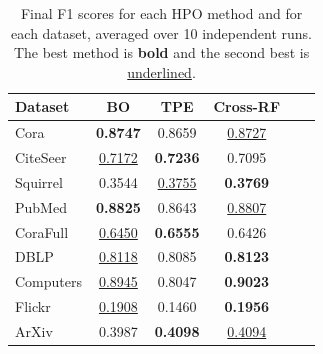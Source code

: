 \begin{table}
	\caption{Final F1 scores for each HPO method and for each dataset, averaged over 10 independent runs. The best method is \textbf{bold} and the second best is \underline{underlined}.}
	\label{tab:cross-rf-final-scores}
	\centering
	\begin{tabular}{lccccc}
		\toprule
		\textbf{Dataset} & \textbf{BO}        & \textbf{TPE}       & \textbf{Cross-RF}  \\
		\midrule
		Cora             & \textbf{0.8747}    & 0.8659             & \underline{0.8727} \\
		CiteSeer         & \underline{0.7172} & \textbf{0.7236}    & 0.7095             \\
		Squirrel         & 0.3544             & \underline{0.3755} & \textbf{0.3769}    \\
		PubMed           & \textbf{0.8825}    & 0.8643             & \underline{0.8807} \\
		CoraFull         & \underline{0.6450} & \textbf{0.6555}    & 0.6426             \\
		DBLP             & \underline{0.8118} & 0.8085             & \textbf{0.8123}    \\
		Computers        & \underline{0.8945} & 0.8047             & \textbf{0.9023}    \\
		Flickr           & \underline{0.1908} & 0.1460             & \textbf{0.1956}    \\
		ArXiv            & 0.3987             & \textbf{0.4098}    & \underline{0.4094} \\
		\bottomrule
	\end{tabular}
\end{table}
